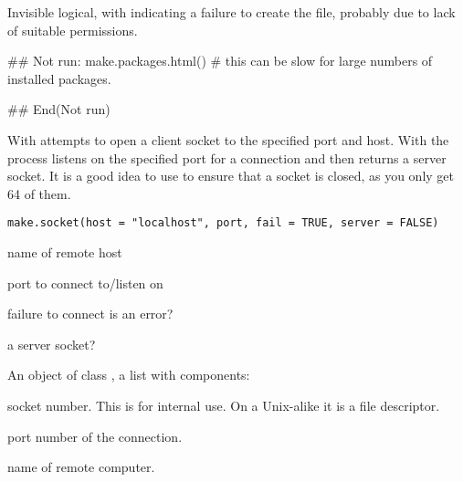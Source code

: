 %
\begin{Value}
Invisible logical, with  indicating a failure to create
the file, probably due to lack of suitable permissions.
\end{Value}
%
\begin{SeeAlso}\relax
{}
\end{SeeAlso}
%
\begin{Examples}
\begin{ExampleCode}
## Not run: 
make.packages.html()
# this can be slow for large numbers of installed packages.

## End(Not run)
\end{ExampleCode}
\end{Examples}
%
\begin{Description}\relax
With  attempts to open a client socket to the
specified port and host.  With  the \R{} process
listens on the specified port for a connection and then returns a
server socket.  It is a good idea to use  to
ensure that a socket is closed, as you only get 64 of them.
\end{Description}
%
\begin{Usage}
\begin{verbatim}
make.socket(host = "localhost", port, fail = TRUE, server = FALSE)
\end{verbatim}
\end{Usage}
%
\begin{Arguments}
\begin{ldescription}
\item[\code{host}] name of remote host
\item[\code{port}] port to connect to/listen on
\item[\code{fail}] failure to connect is an error?
\item[\code{server}] a server socket?
\end{ldescription}
\end{Arguments}
%
\begin{Value}
An object of class , a list with components:
\begin{ldescription}
\item[\code{socket}] socket number.  This is for internal use.  On a
Unix-alike it is a file descriptor.
\item[\code{port}] port number of the connection.
\item[\code{host}] name of remote computer.
\end{ldescription}
\end{Value}
